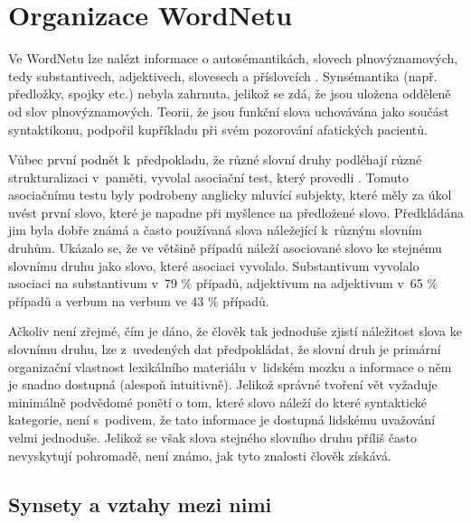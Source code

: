 \documentclass[a4paper, 11pt, oneside, showtrims]{book}
\begin{document}
			\section{Organizace WordNetu}

				Ve WordNetu lze nalézt informace o autosémantikách, slovech plnovýznamových, tedy substantivech, adjektivech, slovesech a příslovcích \parencite{vossen1998introduction}. Synsémantika (např. předložky, spojky etc.) nebyla zahrnuta, jelikož se zdá, že jsou uložena odděleně od slov plnovýznamových. Teorii, že jsou funkční slova uchovávána jako součást syntaktikonu, podpořil kupříkladu \textcite{garrett1982production} při svém pozorování afatických pacientů. 

				Vůbec první podnět k~předpokladu, že různé slovní druhy podléhají různé strukturalizaci v~paměti, vyvolal asociační test, který provedli \textcite{fillenbaum1965grammatical}. Tomuto asociačnímu testu byly podrobeny anglicky mluvící subjekty, které měly za úkol uvést první slovo, které je napadne při myšlence na předložené slovo. Předkládána jim byla dobře známá a často používaná slova náležející k~různým slovním druhům. Ukázalo se, že ve většině případů náleží asociované slovo ke stejnému slovnímu druhu jako slovo, které asociaci vyvolalo. Substantivum vyvolalo asociaci na substantivum v~79 \% případů, adjektivum na adjektivum v~65 \% případů a verbum na verbum ve 43 \% případů. 

				Ačkoliv není zřejmé, čím je dáno, že člověk tak jednoduše zjistí náležitost slova ke slovnímu druhu, lze z~uvedených dat předpokládat, že slovní druh je primární organizační vlastnost lexikálního materiálu v~lidském mozku a informace o něm je snadno dostupná (alespoň intuitivně). Jelikož správné tvoření vět vyžaduje minimálně podvědomé ponětí o tom, které slovo náleží do které syntaktické kategorie, není s~podivem, že tato informace je dostupná lidskému uvažování velmi jednoduše. Jelikož se však slova stejného slovního druhu příliš často nevyskytují pohromadě, není známo, jak tyto znalosti člověk získává. \parencite{fillenbaum1965grammatical, miller1990introduction}

				\subsection{Synsety a vztahy mezi nimi}
				\label{cha:princeton-synset-rels}

\end{document}
